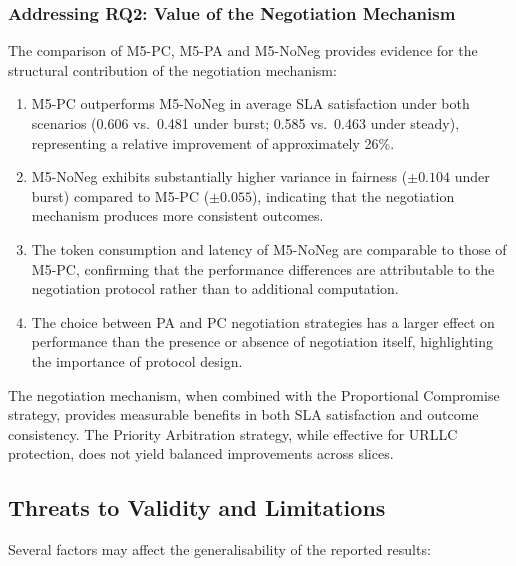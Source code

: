 \subsubsection{Addressing RQ2: Value of the Negotiation Mechanism}

The comparison of M5-PC, M5-PA and M5-NoNeg provides evidence for the structural contribution of the negotiation mechanism:

\begin{enumerate}
    \item M5-PC outperforms M5-NoNeg in average SLA satisfaction under both scenarios (0.606 vs.\ 0.481 under burst; 0.585 vs.\ 0.463 under steady), representing a relative improvement of approximately 26\%.

    \item M5-NoNeg exhibits substantially higher variance in fairness ($\pm 0.104$ under burst) compared to M5-PC ($\pm 0.055$), indicating that the negotiation mechanism produces more consistent outcomes.

    \item The token consumption and latency of M5-NoNeg are comparable to those of M5-PC, confirming that the performance differences are attributable to the negotiation protocol rather than to additional computation.

    \item The choice between PA and PC negotiation strategies has a larger effect on performance than the presence or absence of negotiation itself, highlighting the importance of protocol design.
\end{enumerate}

The negotiation mechanism, when combined with the Proportional Compromise strategy, provides measurable benefits in both SLA satisfaction and outcome consistency. The Priority Arbitration strategy, while effective for URLLC protection, does not yield balanced improvements across slices.

\subsection{Threats to Validity and Limitations}

Several factors may affect the generalisability of the reported results:


